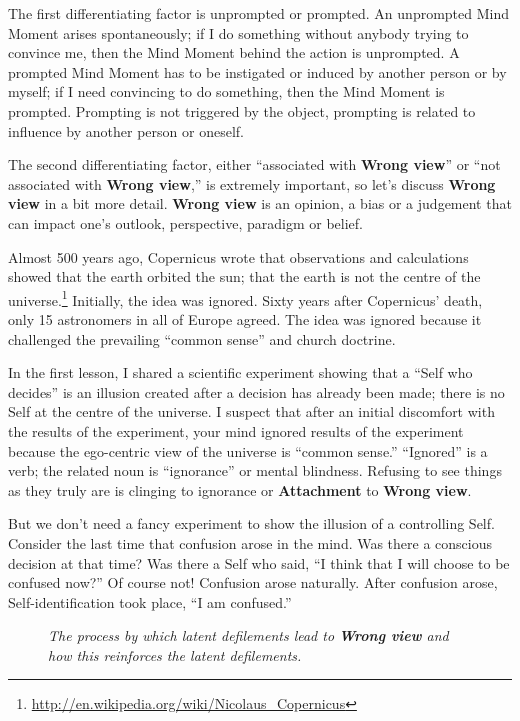 \pagebreak

The first differentiating factor is unprompted or prompted. An unprompted Mind Moment arises spontaneously; if I do something without anybody trying to convince me, then the Mind Moment behind the action is unprompted. A prompted Mind Moment has to be instigated or induced by another person or by myself; if I need convincing to do something, then the Mind Moment is prompted. Prompting is not triggered by the object, prompting is related to influence by another person or oneself.

The second differentiating factor, either “associated with \textbf{Wrong view}” or “not associated with \textbf{Wrong view},” is extremely important, so let’s discuss \textbf{Wrong view} in a bit more detail. \textbf{Wrong view} is an opinion, a bias or a judgement that can impact one’s outlook, perspective, paradigm or belief.

Almost 500 years ago, Copernicus wrote that observations and calculations showed that the earth orbited the sun; that the earth is not the centre of the universe.\footnote{\url{http://en.wikipedia.org/wiki/Nicolaus_Copernicus}} Initially, the idea was ignored. Sixty years after Copernicus’ death, only 15 astronomers in all of Europe agreed. The idea was ignored because it challenged the prevailing “common sense” and church doctrine.

In the first lesson, I shared a scientific experiment showing that a “Self who decides” is an illusion created after a decision has already been made; there is no Self at the centre of the universe. I suspect that after an initial discomfort with the results of the experiment, your mind ignored results of the experiment because the ego-centric view of the universe is “common sense.” “Ignored” is a verb; the related noun is “ignorance” or mental blindness. Refusing to see things as they truly are is clinging to ignorance or \textbf{Attachment} to \textbf{Wrong view}.

But we don’t need a fancy experiment to show the illusion of a controlling Self. Consider the last time that confusion arose in the mind. Was there a conscious decision at that time? Was there a Self who said, “I think that I will choose to be confused now?” Of course not! Confusion arose naturally. After confusion arose, Self-identification took place, “I am confused.”

\begin{figure}[H]
\centering

\caption{\textit{\small The process by which latent defilements lead to \textbf{Wrong view} and how this reinforces the latent defilements.}}
\label{fig:Latent}
\end{figure}

